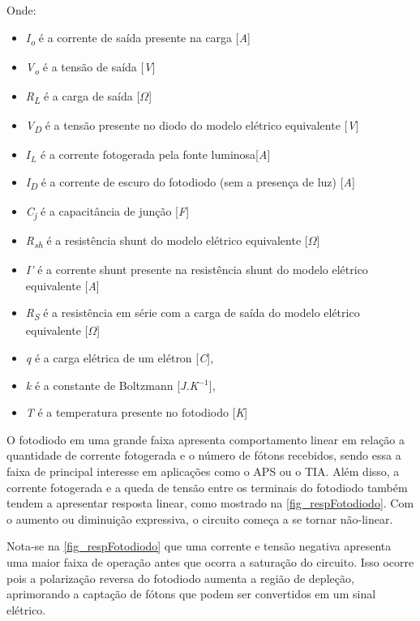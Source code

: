 Onde:
\begin{itemize}
    \item \textit{I\textsubscript{o}} \'e a corrente de saída presente na carga [\textit{A}]
    \item \textit{V\textsubscript{o}} \'e a tensão de saída [\textit{V}]
    \item \textit{R\textsubscript{L}} \'e a carga de saída [\textit{$\Omega$}]
    \item \textit{V\textsubscript{D}} \'e a tensão presente no diodo do modelo el\'etrico equivalente [\textit{V}]
    \item $I_L$ \'e a corrente fotogerada pela fonte luminosa[\textit{A}]
    \item  \textit{I\textsubscript{D}} \'e a corrente de escuro do fotodiodo (sem a presença de luz) [\textit{A}]
    \item \textit{C\textsubscript{j}} \'e a capacit\^ancia de junção [\textit{F}]
    \item \textit{R\textsubscript{sh}} \'e a resist\^encia shunt do modelo el\'etrico equivalente [$\Omega$]
    \item \textit{I\rq} \'e a corrente shunt presente na resistência shunt do modelo el\'etrico equivalente [\textit{A}]
    \item \textit{R\textsubscript{S}} \'e a resistência em s\'erie com a carga de saída do modelo el\'etrico equivalente [$\Omega$]
    \item \textit{q} \'e a carga el\'etrica de um el\'etron [\textit{C}],
    \item \textit{k} \'e a constante de Boltzmann [\textit{J.K$^{-1}$}],
    \item \textit{T} \'e a temperatura presente no fotodiodo [\textit{K}]
\end{itemize}

O fotodiodo em uma grande faixa apresenta comportamento linear em relação a quantidade de corrente fotogerada e o número de fótons recebidos, sendo essa a faixa de principal interesse em aplicações como o APS ou o TIA. Além disso, a corrente fotogerada e a queda de tensão entre os terminais do fotodiodo também tendem a apresentar resposta linear, como mostrado na \autoref{fig_respFotodiodo}. Com o aumento ou diminuição expressiva, o circuito começa a se tornar não-linear.

Nota-se na \autoref{fig_respFotodiodo} que uma corrente e tensão negativa apresenta uma maior faixa de operação antes que ocorra a saturação do circuito. Isso ocorre pois a polarização reversa do fotodiodo aumenta a região de depleção, aprimorando a captação de fótons que podem ser convertidos em um sinal elétrico.

